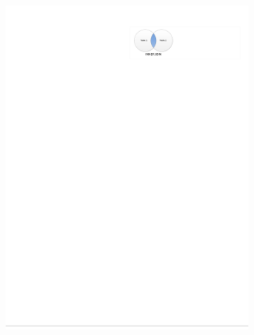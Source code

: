 \begin{figure}[H]
\begin{subfigure}[c]{0.3\textwidth}
  \end{subfigure}
  ~
  \begin{subfigure}[c]{0.3\textwidth}\centering
  \includegraphics[width=\textwidth]{figures/sql/inner_join}
  \label{fig:sql:joins:inner_join}
  \end{subfigure}
  ~
  \begin{subfigure}[c]{0.3\textwidth}\centering

\end{subfigure}
\end{figure}

